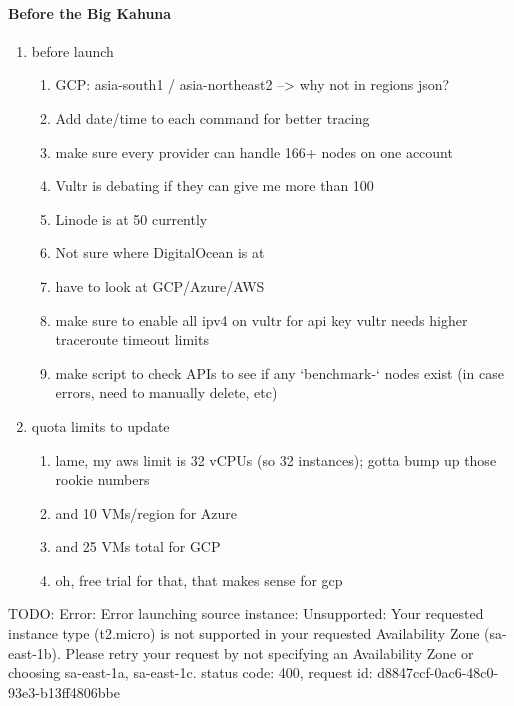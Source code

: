 \documentclass[11pt]{article}
\begin{document}
    \paragraph{Before the Big Kahuna}
    \begin{enumerate}
        \item before launch
        \begin{enumerate}
            \item GCP: asia-south1 / asia-northeast2 --> why not in regions json?
            \item Add date/time to each command for better tracing
            \item make sure every provider can handle 166+ nodes on one account
            \item Vultr is debating if they can give me more than 100
            \item Linode is at 50 currently
            \item Not sure where DigitalOcean is at
            \item have to look at GCP/Azure/AWS
            \item make sure to enable all ipv4 on vultr for api key
            \itm vultr needs higher traceroute timeout limits
            \item make script to check APIs to see if any `benchmark-` nodes exist (in case errors, need to manually delete, etc)
        \end{enumerate}
        \item quota limits to update
        \begin{enumerate}
            \item lame, my aws limit is 32 vCPUs (so 32 instances); gotta bump up those rookie numbers
            \item and 10 VMs/region for Azure
            \item and 25 VMs total for GCP
            \item oh, free trial for that, that makes sense for gcp
        \end{enumerate}
    \end{enumerate}
TODO: Error: Error launching source instance: Unsupported: Your requested instance type (t2.micro) is not supported in your requested Availability Zone (sa-east-1b). Please retry your request by not specifying an Availability Zone or choosing sa-east-1a, sa-east-1c.
	status code: 400, request id: d8847ccf-0ac6-48c0-93e3-b13ff4806bbe
\end{document}
